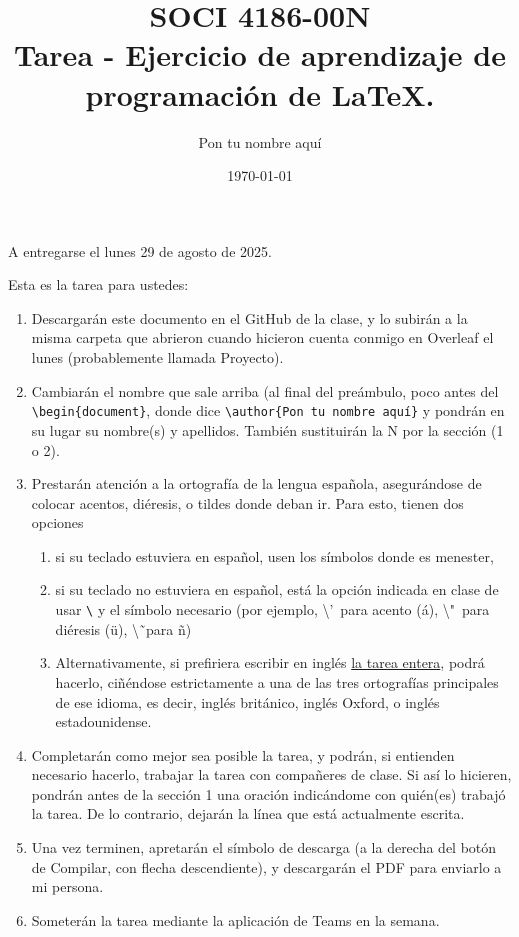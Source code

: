 \documentclass[11pt]{article} %
\title{SOCI 4186-00N \\ Tarea \textnumero 1 - Ejercicio de aprendizaje de programaci\'on de \LaTeX.}
\author{Pon tu nombre aquí}
\date{\today}
\begin{document}
\maketitle
\begin{center}
   A entregarse el lunes 29 de agosto de 2025. 
\end{center}

Esta es la tarea para ustedes: 
\begin{enumerate}
    \item Descargarán este documento en el GitHub de la clase, y lo subirán a la misma carpeta que abrieron cuando hicieron cuenta conmigo en Overleaf el lunes (probablemente llamada Proyecto).
    \item Cambiarán el nombre que sale arriba (al final del preámbulo, poco antes del \texttt{\textbackslash begin\{document\}}, donde dice \texttt{\textbackslash author\{Pon tu nombre aquí\}} y pondrán en su lugar su nombre(s) y apellidos. También sustituirán la N por la sección (1 o 2).
    \item Prestarán atención a la ortografía de la lengua española, asegurándose de colocar acentos, diéresis, o tildes donde deban ir. Para esto, tienen dos opciones 
    \begin{enumerate}
        \item si su teclado estuviera en español, usen los símbolos donde es menester,
        \item si su teclado no estuviera en español, está la opción indicada en clase de usar \texttt{\textbackslash} y el símbolo necesario (por ejemplo, \textbackslash'\ para acento (\'a), \textbackslash "\  para diéresis (\"u), \textbackslash \~\ para \~n)
        \item Alternativamente, si prefiriera escribir en inglés \underline{la tarea entera}, podrá hacerlo, ciñéndose estrictamente a una de las tres ortografías principales de ese idioma, es decir, inglés británico, inglés Oxford, o inglés estadounidense.
    \end{enumerate}
    \item Completarán como mejor sea posible la tarea, y podrán, si entienden necesario hacerlo, trabajar la tarea con compañeres de clase. Si así lo hicieren, pondrán antes de la sección 1 una oración indicándome con quién(es) trabajó la tarea. De lo contrario, dejarán la línea que está actualmente escrita.
    \item  Una vez terminen, apretarán el símbolo de descarga (a la derecha del botón de Compilar, con flecha descendiente), y descargarán el PDF para enviarlo a mi persona.
    \item Someterán la tarea mediante la aplicación de Teams en la semana.
\end{enumerate}
\end{document}
